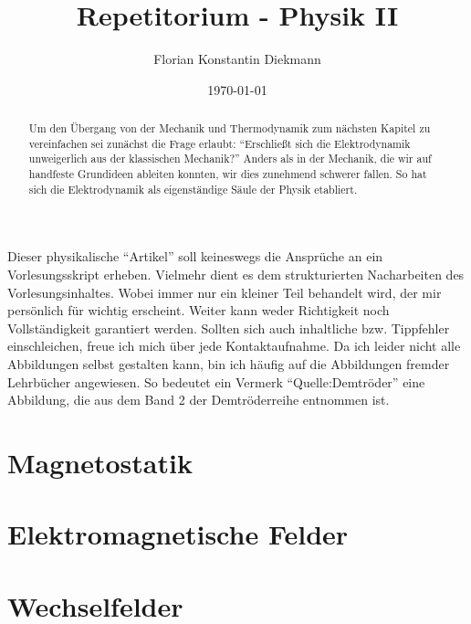 
\title{Repetitorium - Physik II}
\author{Florian Konstantin Diekmann}
\date{\today}



\maketitle
\vspace{3cm}
\begin{abstract}
Um den Übergang von der Mechanik und Thermodynamik zum nächsten Kapitel zu vereinfachen sei zunächst die Frage erlaubt: "`Erschließt sich die Elektrodynamik unweigerlich aus der klassischen Mechanik?"' Anders als in der Mechanik, die wir auf handfeste Grundideen ableiten konnten, wir dies zunehmend schwerer fallen. So hat sich die Elektrodynamik als eigenständige Säule der Physik etabliert. 
\end{abstract}
  

Dieser physikalische "`Artikel"' soll keineswegs die Ansprüche an ein Vorlesungsskript erheben. Vielmehr dient es  
dem strukturierten Nacharbeiten des Vorlesungsinhaltes. Wobei immer nur ein kleiner Teil behandelt wird, der mir persönlich für wichtig erscheint. Weiter kann weder   Richtigkeit noch  Vollständigkeit  garantiert werden. Sollten sich auch  inhaltliche bzw. Tippfehler einschleichen, freue ich mich über jede Kontaktaufnahme.
Da ich leider nicht alle Abbildungen selbst gestalten kann, bin ich häufig auf die Abbildungen fremder Lehrbücher angewiesen. So bedeutet ein Vermerk "`Quelle:Demtröder"' eine Abbildung, die aus dem Band 2 der Demtröderreihe entnommen ist.
\newpage
\tableofcontents
\newpage
%
%


\section{Magnetostatik}
\section{Elektromagnetische Felder}
\section{Wechselfelder}

